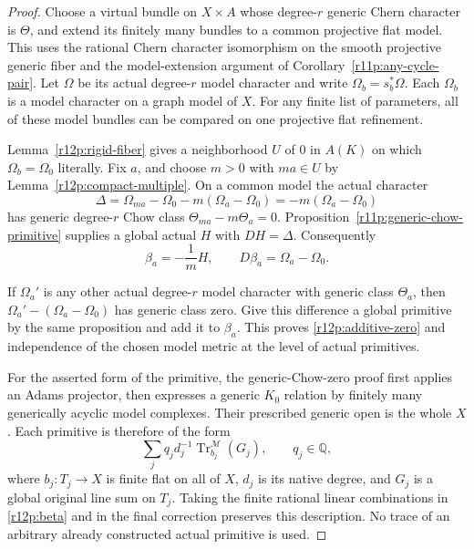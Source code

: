 \documentclass[11pt]{article}
\theoremstyle{definition}
\theoremstyle{remark}
\numberwithin{equation}{section}
\begin{document}
\begin{proof}
Choose a virtual bundle on $X\times A$ whose degree-$r$ generic
Chern character is $\Theta$, and extend its finitely many bundles
to a common projective flat model.  This uses the rational Chern
character isomorphism on the smooth projective generic fiber and
the model-extension argument of Corollary~\ref{r11p:any-cycle-pair}.
Let $\Omega$ be its actual degree-$r$ model character and write
$\Omega_b=s_b^*\Omega$.  Each $\Omega_b$ is a model character on a
graph model of $X$.  For any finite list of parameters, all of these
model bundles can be compared on one projective flat refinement.

Lemma~\ref{r12p:rigid-fiber} gives a neighborhood $U$ of $0$ in
$A(K)$ on which $\Omega_b=\Omega_0$ literally.  Fix $a$, and choose
$m>0$ with $ma\in U$ by Lemma~\ref{r12p:compact-multiple}.  On a
common model the actual character
\[
 \Delta=\Omega_{ma}-\Omega_0-m(\Omega_a-\Omega_0)
                 =-m(\Omega_a-\Omega_0)
\tag{R12.P5}\label{r12p:delta}
\]
has generic degree-$r$ Chow class
$\Theta_{ma}-m\Theta_a=0$.  Proposition~\ref{r11p:generic-chow-primitive} supplies a global actual $H$ with $DH=\Delta$.
Consequently
\[
                 \beta_a=-\frac{1}{m}H,
                 \qquad D\beta_a=\Omega_a-\Omega_0.
\tag{R12.P6}\label{r12p:beta}
\]

If $\Omega_a'$ is any other actual degree-$r$ model character with
generic class $\Theta_a$, then
$\Omega_a'-(\Omega_a-\Omega_0)$ has generic class zero.  Give this
difference a global primitive by the same proposition and add it to
$\beta_a$.  This proves \eqref{r12p:additive-zero} and independence
of the chosen model metric at the level of actual primitives.

For the asserted form of the primitive, the generic-Chow-zero proof
first applies an Adams projector, then expresses a generic $K_0$
relation by finitely many generically acyclic model complexes.
Their prescribed generic open is the whole $X$.  Each primitive is
therefore of the form
\[
       \sum_j q_jd_j^{-1}\operatorname{Tr}^{\mathscr M}_{b_j}(G_j),
       \qquad q_j\in\mathbb Q,
\tag{R12.P7}\label{r12p:certificate}
\]
where $b_j:T_j\to X$ is finite flat on all of $X$, $d_j$ is its
native degree, and $G_j$ is a global original line sum on $T_j$.
Taking the finite rational linear combinations in
\eqref{r12p:beta} and in the final correction preserves this
description.  No trace of an arbitrary already constructed actual
primitive is used.
\end{proof}
\end{document}
